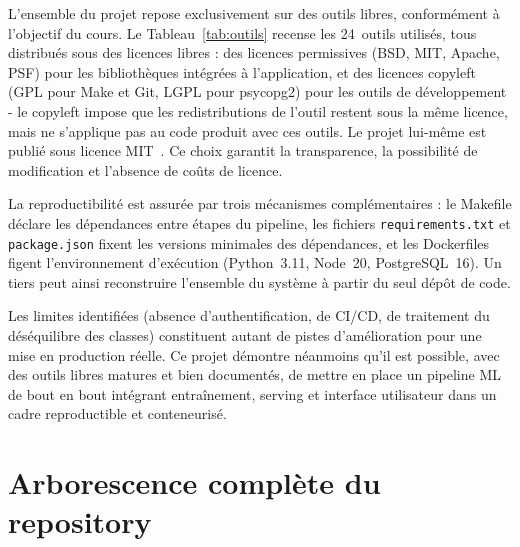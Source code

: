 \documentclass[12pt,a4paper,openany]{report}
\begin{document}
L'ensemble du projet repose exclusivement sur des outils libres, conformément à l'objectif du cours. Le Tableau~\ref{tab:outils} recense les 24~outils utilisés, tous distribués sous des licences libres : des licences permissives (BSD, MIT, Apache, PSF) pour les bibliothèques intégrées à l'application, et des licences copyleft (GPL pour Make et Git, LGPL pour psycopg2) pour les outils de développement - le copyleft impose que les redistributions de l'outil restent sous la même licence, mais ne s'applique pas au code produit avec ces outils. Le projet lui-même est publié sous licence MIT~\cite{mit-license}. Ce choix garantit la transparence, la possibilité de modification et l'absence de coûts de licence.

La reproductibilité est assurée par trois mécanismes complémentaires : le Makefile déclare les dépendances entre étapes du pipeline, les fichiers \texttt{requirements.txt} et \texttt{package.json} fixent les versions minimales des dépendances, et les Dockerfiles figent l'environnement d'exécution (Python~3.11, Node~20, PostgreSQL~16). Un tiers peut ainsi reconstruire l'ensemble du système à partir du seul dépôt de code.

Les limites identifiées (absence d'authentification, de CI/CD, de traitement du déséquilibre des classes) constituent autant de pistes d'amélioration pour une mise en production réelle. Ce projet démontre néanmoins qu'il est possible, avec des outils libres matures et bien documentés, de mettre en place un pipeline ML de bout en bout intégrant entraînement, serving et interface utilisateur dans un cadre reproductible et conteneurisé.


\cleardoublepage
{}
{}



\appendix

\chapter{Arborescence complète du repository}
\end{document}
